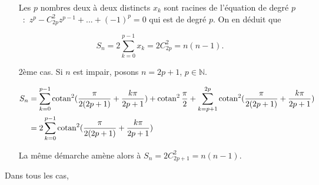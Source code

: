 \documentclass[11pt,a4paper]{article}
\newcommand{\Nn}{\mathbb{N}} \newcommand{\N}{\mathbb{N}}
\newcommand{\cotan}{\mathop{\mathrm{cotan}}\nolimits}
\begin{document}
\begin{itemize}
Les $p$ nombres deux à deux distincts $x_k$ sont racines de l'équation de degré $p$~:~$z^p-C_{2p}^{2}z^{p-1}+...+(-1)^p=0$ qui est de degré $p$. On en déduit que 

$$S_n=2\sum_{k=0}^{p-1}x_k=2C_{2p}^{2}=n(n-1).$$

\item[2ème cas.] Si $n$ est impair, posons $n=2p+1$, $p\in\Nn$.

\begin{align*}\ensuremath
S_n&=\sum_{k=0}^{p-1}\cotan^2(\frac{\pi}{2(2p+1)}+\frac{k\pi}{2p+1})+\cotan^2\frac{\pi}{2}+\sum_{k=p+1}^{2p}\cotan^2(\frac{\pi}{2(2p+1)}+\frac{k\pi}{2p+1})\\
 &=2\sum_{k=0}^{p-1}\cotan^2(\frac{\pi}{2(2p+1)}+\frac{k\pi}{2p+1})
\end{align*}

La même démarche amène alors à $S_n=2C_{2p+1}^{2}=n(n-1)$.
\end{itemize}

Dans tous les cas, 
\end{document}
